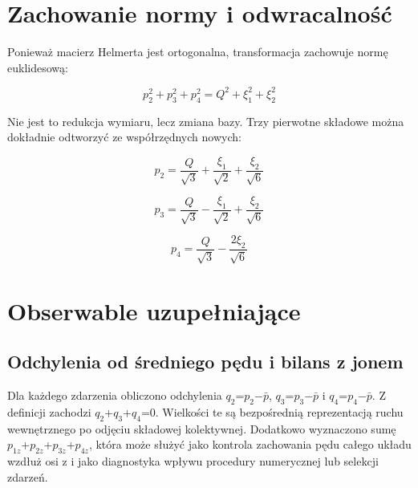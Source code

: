 \documentclass[12pt,letterpaper,oneside]{report}
\numberwithin{equation}{chapter}
\numberwithin{figure}{chapter}
\numberwithin{table}{chapter}
\begin{document}
\section{Zachowanie normy i odwracalność}

Ponieważ macierz Helmerta jest ortogonalna, transformacja zachowuje
normę euklidesową:

\begin{equation}
p_2^2+p_3^2+p_4^2=Q^2+\xi_1^2+\xi_2^2
\label{eq:13}
\end{equation}

Nie jest to redukcja wymiaru, lecz zmiana bazy. Trzy pierwotne składowe
można dokładnie odtworzyć ze współrzędnych nowych:

\begin{equation}
p_2=\frac{Q}{\sqrt3}+\frac{\xi_1}{\sqrt2}+\frac{\xi_2}{\sqrt6}
\label{eq:14}
\end{equation}

\begin{equation}
p_3=\frac{Q}{\sqrt3}-\frac{\xi_1}{\sqrt2}+\frac{\xi_2}{\sqrt6}
\label{eq:15}
\end{equation}

\begin{equation}
p_4=\frac{Q}{\sqrt3}-\frac{2\xi_2}{\sqrt6}
\label{eq:16}
\end{equation}

\section{Obserwable uzupełniające}

\subsection{Odchylenia od średniego pędu i bilans z jonem}

Dla każdego zdarzenia obliczono odchylenia \ensuremath{q_2}=\ensuremath{p_2}\ensuremath{-}\ensuremath{\bar p}, \ensuremath{q_3}=\ensuremath{p_3}\ensuremath{-}\ensuremath{\bar p} i \ensuremath{q_4}=\ensuremath{p_4}\ensuremath{-}\ensuremath{\bar p}. Z
definicji zachodzi \ensuremath{q_2}+\ensuremath{q_3}+\ensuremath{q_4}=0. Wielkości te są bezpośrednią
reprezentacją ruchu wewnętrznego po odjęciu składowej kolektywnej.
Dodatkowo wyznaczono sumę \ensuremath{p_{1z}}+\ensuremath{p_{2z}}+\ensuremath{p_{3z}}+\ensuremath{p_{4z}}, która może służyć jako
kontrola zachowania pędu całego układu wzdłuż osi z i jako diagnostyka
wpływu procedury numerycznej lub selekcji zdarzeń.
\end{document}
